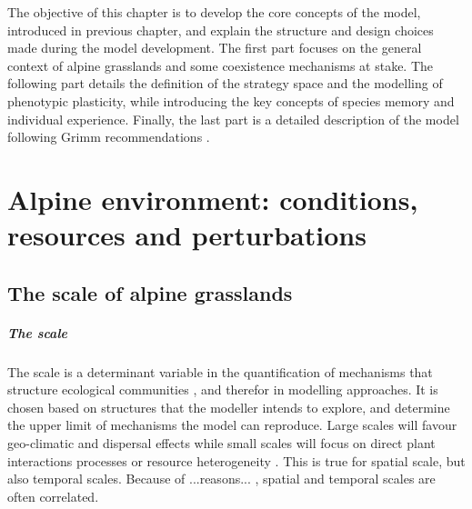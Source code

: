 %


\begin{fullwidth}
The objective of this chapter is to develop the core concepts of the model, introduced in previous chapter, and explain the structure and design choices made during the model development. The first part focuses on the general context of alpine grasslands and some coexistence mechanisms at stake. The following part details the definition of the strategy space and the modelling of phenotypic plasticity, while introducing the key concepts of species memory and individual experience. Finally, the last part is a detailed description of the model following Grimm recommendations \cite{grimm_standard_2006}.
\end{fullwidth}

\chapter{Alpine environment: conditions, resources and perturbations}
\section{The scale of alpine grasslands}

\paragraph{The scale}
The scale is a determinant variable in the quantification of mechanisms that structure ecological communities \cite{bello_hierarchical_2013}, and therefor in modelling approaches. It is chosen based on structures that the modeller intends to explore, and determine the upper limit of mechanisms the model can reproduce. Large scales will favour geo-climatic and dispersal effects \cite{kleidon_global_2000} while small scales will focus on direct plant interactions processes or resource heterogeneity \cite{ soussana_gemini:_2012, maire_plasticity_2013, taubert_modelling_2014}. This is true for spatial scale, but also temporal scales. Because of ...reasons... , spatial and temporal scales are often correlated.

